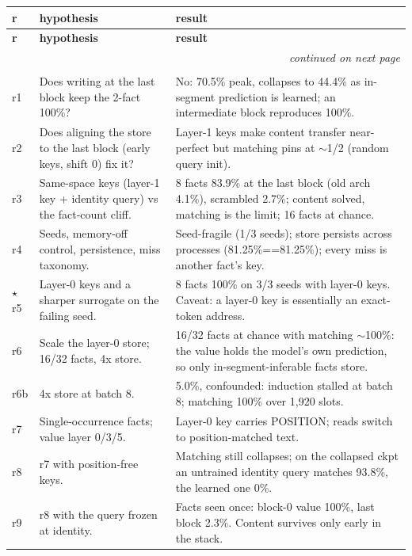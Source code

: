 {\footnotesize
\begin{longtable}{@{}p{} p{} p{}@{}}
\toprule
\textbf{r} & \textbf{hypothesis} & \textbf{result} \\
\midrule
\endfirsthead
\toprule
\textbf{r} & \textbf{hypothesis} & \textbf{result} \\
\midrule
\endhead
\midrule
\multicolumn{3}{r}{\emph{continued on next page}} \\
\endfoot
\bottomrule
\endlastfoot

\multicolumn{3}{@{}l}{\textbf{Placement and where content survives (r1--r23)}} \\
\midrule
r1 & Does writing at the last block keep the 2-fact 100\%? & No: 70.5\% peak, collapses to 44.4\% as in-segment prediction is learned; an intermediate block reproduces 100\%. \\
r2 & Does aligning the store to the last block (early keys, shift 0) fix it? & Layer-1 keys make content transfer near-perfect but matching pins at $\sim$1/2 (random query init). \\
r3 & Same-space keys (layer-1 key + identity query) vs the fact-count cliff. & 8 facts 83.9\% at the last block (old arch 4.1\%), scrambled 2.7\%; content solved, matching is the limit; 16 facts at chance. \\
r4 & Seeds, memory-off control, persistence, miss taxonomy. & Seed-fragile (1/3 seeds); store persists across processes (81.25\%==81.25\%); every miss is another fact's key. \\
$\star$\,r5 & Layer-0 keys and a sharper surrogate on the failing seed. & 8 facts 100\% on 3/3 seeds with layer-0 keys. Caveat: a layer-0 key is essentially an exact-token address. \\
r6 & Scale the layer-0 store; 16/32 facts, 4x store. & 16/32 facts at chance with matching $\sim$100\%: the value holds the model's own prediction, so only in-segment-inferable facts store. \\
r6b & 4x store at batch 8. & 5.0\%, confounded: induction stalled at batch 8; matching 100\% over 1{,}920 slots. \\
r7 & Single-occurrence facts; value layer 0/3/5. & Layer-0 key carries POSITION; reads switch to position-matched text. \\
r8 & r7 with position-free keys. & Matching still collapses; on the collapsed ckpt an untrained identity query matches 93.8\%, the learned one 0\%. \\
r9 & r8 with the query frozen at identity. & Facts seen once: block-0 value 100\%, last block 2.3\%. Content survives only early in the stack. \\

\end{longtable}}
